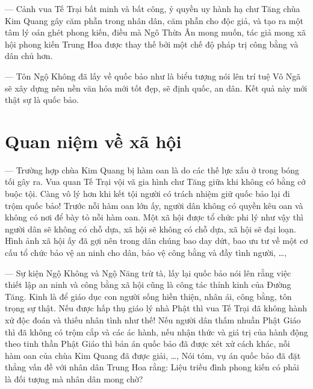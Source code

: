— Cảnh vua Tế Trại bất minh và bất công, ỷ quyền uy hành hạ chư Tăng chùa Kim Quang gây căm phẫn trong nhân dân, căm phẫn cho độc giả, và tạo ra một tâm lý oán ghét phong kiến, điều mà Ngô Thừa Ân mong muốn, tác giả mong xã hội phong kiến Trung Hoa được thay thế bởi một chế độ pháp trị công bằng và dân chủ hơn.

— Tôn Ngộ Không đã lấy về quốc bảo như là biểu tượng nói lên trí tuệ Vô Ngã sẽ xây dựng nên nền văn hóa mới tốt đẹp, sẽ định quốc, an dân. Kết quả này mới thật sự là quốc bảo.

\section{Quan niệm về xã hội} %
\label{sec:62_63_xa_hoi}

— Trường hợp chùa Kim Quang bị hàm oan là do các thế lực xấu ở trong bóng tối gây ra. Vua quan Tế Trại vội vã gia hình chư Tăng giữa khi không có bằng cớ buộc tội. Càng vô lý hơn khi kết tội người có trách nhiệm giữ quốc bảo lại đi trộm quốc bảo! Trước nỗi hàm oan lớn ấy, người dân không có quyền kêu oan và không có nơi để bày tỏ nỗi hàm oan. Một xã hội được tổ chức phi lý như vậy thì người dân sẽ không có chỗ dựa, xã hội sẽ không có chỗ dựa, xã hội sẽ đại loạn. Hình ảnh xã hội ấy đã gợi nên trong dân chúng bao day dứt, bao ưu tư về một cơ cấu tổ chức bảo vệ an ninh cho dân, bảo vệ công bằng và đầy tình người, \ldots,

— Sự kiện Ngộ Không và Ngộ Năng trừ tà, lấy lại quốc bảo nói lên rằng việc thiết lập an ninh và công bằng xã hội cũng là công tác thỉnh kinh của Đường Tăng. Kinh là để giáo dục con người sống hiền thiện, nhân ái, công bằng, tôn trọng sự thật. Nếu được hấp thụ giáo lý nhà Phật thì vua Tế Trại đã không hành xử độc đoán và thiếu nhân tình như thế! Nếu người dân thấm nhuần Phật Giáo thì đã không có trộm cắp và các ác hành, nếu nhận thức và giá trị của hành động theo tinh thần Phật Giáo thì bản án quốc bảo đã được xét xử cách khác, nỗi hàm oan của chùa Kim Quang đã được giải, \ldots, Nói tóm, vụ án quốc bảo đã đặt thẳng vấn đề với nhân dân Trung Hoa rằng: Liệu triều đình phong kiến có phải là đối tượng mà nhân dân mong chờ?
